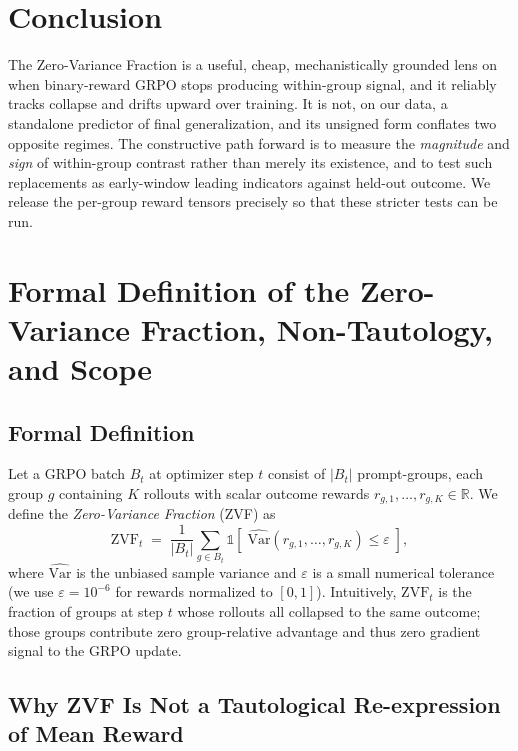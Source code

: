 \documentclass{article}
\begin{document}
\section{Conclusion}
\label{sec:p2-conclusion}
The Zero-Variance Fraction is a useful, cheap, mechanistically grounded lens on
when binary-reward GRPO stops producing within-group signal, and it reliably
tracks collapse and drifts upward over training. It is not, on our data, a
standalone predictor of final generalization, and its unsigned form conflates two
opposite regimes. The constructive path forward is to measure the \emph{magnitude}
and \emph{sign} of within-group contrast rather than merely its existence, and to
test such replacements as early-window leading indicators against held-out outcome.
We release the per-group reward tensors precisely so that these stricter tests can
be run.
 \appendix
\section{Formal Definition of the Zero-Variance Fraction, Non-Tautology, and Scope}
\label{sec:appendix:zvf-formalization}

\subsection{Formal Definition}

Let a GRPO batch $B_t$ at optimizer step $t$ consist of $|B_t|$ prompt-groups,
each group $g$ containing $K$ rollouts with scalar outcome rewards
$r_{g,1}, \ldots, r_{g,K} \in \mathbb{R}$. We define the \emph{Zero-Variance
Fraction} (ZVF) as
\begin{equation}
\label{eq:zvf}
\mathrm{ZVF}_t \;=\; \frac{1}{|B_t|} \sum_{g \in B_t}
  \mathbb{1}\!\left[\;\widehat{\mathrm{Var}}(r_{g,1}, \ldots, r_{g,K}) \le \varepsilon\;\right],
\end{equation}
where $\widehat{\mathrm{Var}}$ is the unbiased sample variance and
$\varepsilon$ is a small numerical tolerance
(we use $\varepsilon = 10^{-6}$ for rewards normalized to $[0,1]$).
Intuitively, $\mathrm{ZVF}_t$ is the fraction of groups at step $t$ whose
rollouts all collapsed to the same outcome; those groups contribute zero
group-relative advantage and thus zero gradient signal to the GRPO update.

\subsection{Why ZVF Is Not a Tautological Re-expression of Mean Reward}
\end{document}
